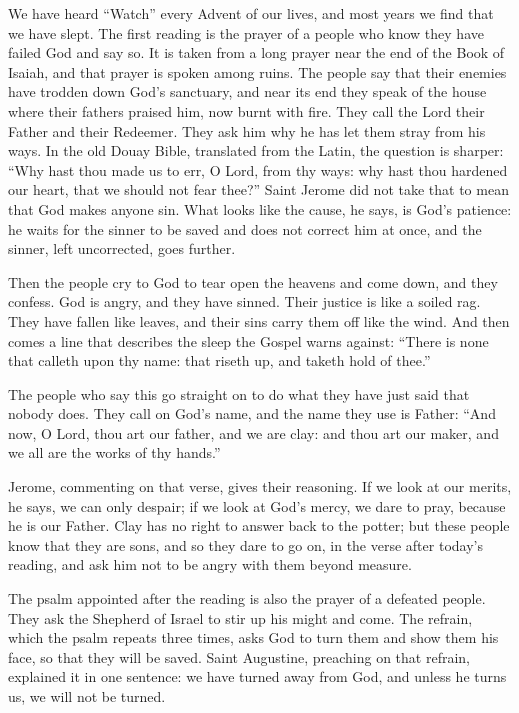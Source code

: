 \bigskip

We have heard ``Watch'' every Advent of our lives, and most years we find
that we have slept. The first reading is the prayer of a people who know
they have failed God and say so. It is taken from a long prayer near the end
of the Book of Isaiah, and that prayer is spoken among ruins. The people say
that their enemies have trodden down God's sanctuary, and near its end they
speak of the house where their fathers praised him, now burnt with fire.
They call the Lord their Father and their Redeemer. They ask him why he has
let them stray from his ways. In the old Douay Bible, translated from the
Latin, the question is sharper: ``Why hast thou made us to err, O Lord, from
thy ways: why hast thou hardened our heart, that we should not fear thee?''
Saint Jerome did not take that to mean that God makes anyone sin. What looks
like the cause, he says, is God's patience: he waits for the sinner to be
saved and does not correct him at once, and the sinner, left uncorrected,
goes further.

Then the people cry to God to tear open the heavens and come down, and they
confess. God is angry, and they have sinned. Their justice is like a soiled
rag. They have fallen like leaves, and their sins carry them off like the
wind. And then comes a line that describes the sleep the Gospel warns
against: ``There is none that calleth upon thy name: that riseth up, and
taketh hold of thee.''

The people who say this go straight on to do what they have just said that
nobody does. They call on God's name, and the name they use is Father: ``And
now, O Lord, thou art our father, and we are clay: and thou art our maker,
and we all are the works of thy hands.''

Jerome, commenting on that verse, gives their reasoning. If we look at our
merits, he says, we can only despair; if we look at God's mercy, we dare to
pray, because he is our Father. Clay has no right to answer back to the
potter; but these people know that they are sons, and so they dare to go on,
in the verse after today's reading, and ask him not to be angry with them
beyond measure.

\bigskip

The psalm appointed after the reading is also the prayer of a defeated
people. They ask the Shepherd of Israel to stir up his might and come. The
refrain, which the psalm repeats three times, asks God to turn them and show
them his face, so that they will be saved. Saint Augustine, preaching on that
refrain, explained it in one sentence: we have turned away from God, and
unless he turns us, we will not be turned.

